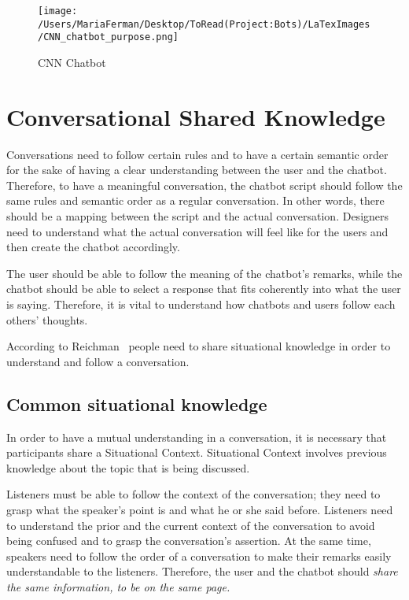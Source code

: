 \documentclass[a4paper,10pt]{article}
\begin{document}
\begin{figure}
\centering
\texttt{[image: /Users/MariaFerman/Desktop/ToRead(Project:Bots)/LaTexImages/CNN\_chatbot\_purpose.png]}
\caption{CNN Chatbot}
\label{FigurePurpose}
\end{figure}

\section{Conversational Shared Knowledge}

Conversations need to follow certain rules and to have a certain semantic order for the sake of having a clear understanding between the user and the chatbot. Therefore, to have a meaningful conversation, the chatbot script should follow the same rules and semantic order as a regular conversation. In other words, there should be a mapping between the script and the actual conversation. Designers need to understand what the actual conversation will feel like for the users and then create the chatbot accordingly. 

The user should be able to follow the meaning of the chatbot's remarks, while the chatbot should be able to select a response that fits coherently into what the user is saying. Therefore, it is vital to understand how chatbots and users follow each others' thoughts.

According to Reichman~\cite{reichman1985getting} people need to share situational knowledge in order to understand and follow a conversation.

\subsection{Common situational knowledge}
In order to have a mutual understanding in a conversation, it is necessary that participants share a Situational Context. Situational Context involves previous knowledge about the topic that is being discussed.  

Listeners must be able to follow the context of the conversation; they need to grasp what the speaker's point is and what he or she said before. Listeners need to understand the prior and the current context of the conversation to avoid being confused and to grasp the conversation's assertion. At the same time, speakers need to follow the order of a conversation to make their remarks easily understandable to the listeners. Therefore, the user and the chatbot should \textit{share the same information, to be on the same page.} 
\end{document}
